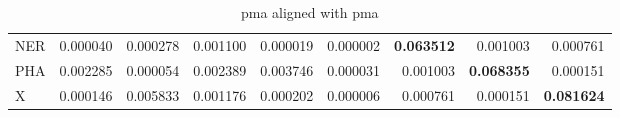 \begin{table}[H]
\begin{center}
{\begin{tabular}{lrrrrrrrr}
NER & {\cellcolor[HTML]{FFFFE5}} \color[HTML]{000000} 0.000040 & {\cellcolor[HTML]{FFFFE5}} \color[HTML]{000000} 0.000278 & {\cellcolor[HTML]{FFFFE4}} \color[HTML]{000000} 0.001100 & {\cellcolor[HTML]{FFFFE5}} \color[HTML]{000000} 0.000019 & {\cellcolor[HTML]{FFFFE5}} \color[HTML]{000000} 0.000002 & {\cellcolor[HTML]{CBEA9C}} \color[HTML]{000000} \bfseries 0.063512 & {\cellcolor[HTML]{FFFFE4}} \color[HTML]{000000} 0.001003 & {\cellcolor[HTML]{FFFFE5}} \color[HTML]{000000} 0.000761 \\
PHA & {\cellcolor[HTML]{FEFFE2}} \color[HTML]{000000} 0.002285 & {\cellcolor[HTML]{FFFFE5}} \color[HTML]{000000} 0.000054 & {\cellcolor[HTML]{FEFFE2}} \color[HTML]{000000} 0.002389 & {\cellcolor[HTML]{FEFFDF}} \color[HTML]{000000} 0.003746 & {\cellcolor[HTML]{FFFFE5}} \color[HTML]{000000} 0.000031 & {\cellcolor[HTML]{FFFFE4}} \color[HTML]{000000} 0.001003 & {\cellcolor[HTML]{C3E698}} \color[HTML]{000000} \bfseries 0.068355 & {\cellcolor[HTML]{FFFFE5}} \color[HTML]{000000} 0.000151 \\
X & {\cellcolor[HTML]{FFFFE5}} \color[HTML]{000000} 0.000146 & {\cellcolor[HTML]{FDFEDD}} \color[HTML]{000000} 0.005833 & {\cellcolor[HTML]{FFFFE4}} \color[HTML]{000000} 0.001176 & {\cellcolor[HTML]{FFFFE5}} \color[HTML]{000000} 0.000202 & {\cellcolor[HTML]{FFFFE5}} \color[HTML]{000000} 0.000006 & {\cellcolor[HTML]{FFFFE5}} \color[HTML]{000000} 0.000761 & {\cellcolor[HTML]{FFFFE5}} \color[HTML]{000000} 0.000151 & {\cellcolor[HTML]{ACDD8E}} \color[HTML]{000000} \bfseries 0.081624 \\
\bottomrule
\end{tabular}
}\end{center}
\caption{pma aligned with pma}\end{table}